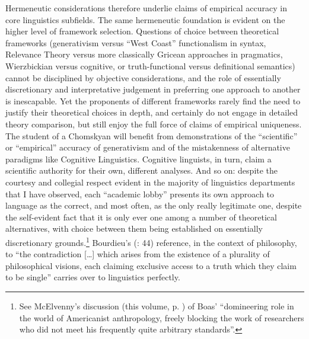 \documentclass[output=paper]{langscibook}
\begin{document}
Hermeneutic considerations therefore underlie claims of empirical accuracy in core linguistics subfields. The same hermeneutic foundation is evident on the higher level of framework selection. Questions of choice between theoretical frameworks (generativism versus ``West Coast'' functionalism in syntax, Relevance Theory versus more classically Gricean approaches in pragmatics, Wierzbickian versus cognitive, or truth-functional versus definitional semantics) cannot be disciplined by objective considerations, and the role of essentially discretionary and interpretative judgement in preferring one approach to another is inescapable. Yet the proponents of different frameworks rarely find the need to justify their theoretical choices in depth, and certainly do not engage in detailed theory comparison, but still enjoy the full force of claims of empirical uniqueness. The student of a Chomskyan will benefit from demonstrations of the ``scientific'' or ``empirical'' accuracy of generativism and of the mistakenness of alternative paradigms like Cognitive Linguistics. Cognitive linguists, in turn, claim a scientific authority for their own, different analyses. And so on: despite the courtesy and collegial respect evident in the majority of linguistics departments that I have observed, each ``academic lobby'' \citep[155]{Rastier1993} presents its own approach to language as the correct, and most often, as the only really legitimate one, despite the self-evident fact that it is only ever one among a number of theoretical alternatives, with choice between them being established on essentially discretionary grounds.\footnote{See McElvenny's discussion (this volume, p. \pageref{q:mcelvenny:domineering}) of Boas' ``domineering role in the world of Americanist anthropology, freely blocking the work of researchers who did not meet his frequently quite arbitrary standards''.} Bourdieu's (\citeyear{Bourdieu20031997}: 44) reference, in the context of philosophy, to ``the contradiction […] which arises from the existence of a plurality of philosophical visions, each claiming exclusive access to a truth which they claim to be single'' carries over to linguistics perfectly.
\end{document}
